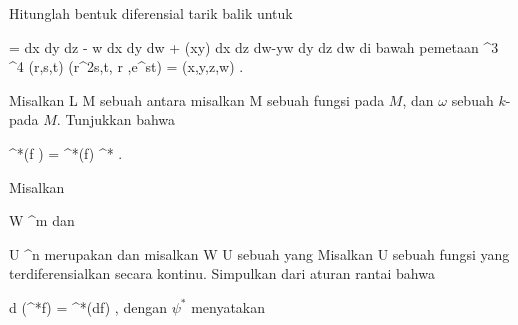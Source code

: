 {}
{

Hitunglah bentuk diferensial tarik balik
\mathl{\varphi^* \tau}{} untuk

\mavergleichskettedisp
{\vergleichskette
{ \tau
}
{ =} { dx \wedge dy \wedge dz - w dx \wedge dy \wedge dw + \cos (xy)  dx \wedge dz \wedge dw-yw dy \wedge dz \wedge dw
}
{ } {
}
{ } {
}
{ } {
}
}
{}{}{}
di bawah pemetaan
\maabbeledisp {\varphi} {\R^3} {\R^4
} {(r,s,t)} { (r^2s,t, \sin  r ,e^{st}) = (x,y,z,w)
} {.}

}
{} {}

{}
{

Misalkan
\maabbdisp {\psi} { L } { M
} {}
sebuah
antara
misalkan
 { M } {\R
} {}
sebuah fungsi pada $M$, dan $\omega$ sebuah
$k$-
pada $M$. Tunjukkan bahwa

\mavergleichskettedisp
{\vergleichskette
{ \psi^*(f \omega)
}
{ =} { \psi^*(f)  \psi^* \omega
}
{ } {
}
{ } {
}
{ } {
}
}
{}{}{.}

}
{} {}

{}
{

Misalkan

\mavergleichskette
{\vergleichskette
{ W
}
{ \subseteq }{ \R^m
}
{  }{
}
{    }{
}
{   }{
}
}
{}{}{}
dan

\mavergleichskette
{\vergleichskette
{ U
}
{ \subseteq }{ \R^n
}
{  }{
}
{    }{
}
{   }{
}
}
{}{}{}
merupakan
dan misalkan
\maabbdisp {\psi} { W } { U
} {}
sebuah
 yang
Misalkan
 { U } {\R
} {}
sebuah fungsi yang terdiferensialkan secara kontinu. Simpulkan dari
aturan rantai
bahwa

\mavergleichskettedisp
{\vergleichskette
{ d (\psi^*f)
}
{ =} { \psi^*(df)
}
{ } {
}
{ } {
}
{ } {
}
}
{}{}{,}
dengan $\psi^*$ menyatakan

}
{} {}


